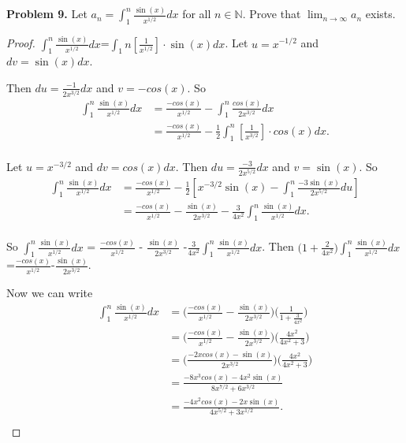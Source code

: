 \documentclass[12pt]{article}
\begin{document}
\begin{flushleft}

\textbf{Problem 9.} Let $a_{n}= \int_{1}^{n} \frac{\sin(x)}{x^{1/2}} dx$ for all $n \in \mathbb{N}$. Prove that $\lim_{n \to \infty} a_{n}$ exists. 

\vspace{.2cm}

\begin{proof}

$\int_{1}^{n} \frac{\sin(x)}{x^{1/2}} dx$=$\int_{1}{n} [\frac{1}{x^{1/2}}] \cdot \sin(x) dx$. Let $u=x^{-1/2}$ and $dv=\sin(x)dx$. 

\vspace{.1cm}

Then $du=\frac{-1}{2x^{3/2}}dx$ and $v=-cos(x)$. So 
\begin{align*}
\int_{1}^{n} \frac{\sin(x)}{x^{1/2}} dx &= \frac{-cos(x)}{x^{1/2}} - \int_{1}^{n} \frac{cos(x)}{2x^{3/2}} dx \\
							  &= \frac{-cos(x)}{x^{1/2}} - \frac{1}{2} \int_{1}^{n} [\frac{1}{x^{3/2}}] \cdot cos(x) dx. \\
\end{align*}

Let $u=x^{-3/2}$ and $dv=cos(x)dx$. Then $du=\frac{-3}{2x^{5/2}}dx$ and $v=\sin(x)$. So
\begin{align*}
\int_{1}^{n} \frac{\sin(x)}{x^{1/2}} dx &= \frac{-cos(x)}{x^{1/2}} - \frac{1}{2}[x^{-3/2}\sin(x)-\int_{1}^{n} \frac{-3\sin(x)}{2x^{5/2}} du] \\
						      &= \frac{-cos(x)}{x^{1/2}} - \frac{\sin(x)}{2x^{3/2}} -\frac{3}{4x^{2}} \int_{1}^{n} \frac{\sin(x)}{x^{1/2}} dx.\\
\end{align*}

So $\int_{1}^{n} \frac{\sin(x)}{x^{1/2}} dx$ = $\frac{-cos(x)}{x^{1/2}}$ - $\frac{\sin(x)}{2x^{3/2}}$ -$\frac{3}{4x^{2}} \int_{1}^{n} \frac{\sin(x)}{x^{1/2}} dx$. Then 
$\big(1+\frac{2}{4x^{2}}\big) \int_{1}^{n} \frac{\sin(x)}{x^{1/2}} dx$=$\frac{-cos(x)}{x^{1/2}}$-$\frac{\sin(x)}{2x^{3/2}}$.

\vspace{.1cm}

Now we can write
\begin{align*}
\int_{1}^{n} \frac{\sin(x)}{x^{1/2}}dx 
	&=\big( \frac{-cos(x)}{x^{1/2}} - \frac{\sin(x)}{2x^{3/2}}\big) \big( \frac{1}{1+\frac{3}{4x^{2}}} \big) \\
	&= \big( \frac{-cos(x)}{x^{1/2}} - \frac{\sin(x)}{2x^{3/2}} \big) \big( \frac{4x^{2}}{4x^{2}+3} \big) \\
	&= \big( \frac{-2xcos(x)-\sin(x)}{2x^{3/2}} \big) \big( \frac{4x^{2}}{4x^{2}+3} \big) \\
	&= \frac{-8x^{3}cos(x)-4x^{2}\sin(x)}{8x^{7/2}+6x^{3/2}} \\
	&= \frac{-4x^{2}cos(x) - 2x\sin(x)}{4x^{5/2}+3x^{1/2}}.\\
\end{align*}


\end{proof}
\end{flushleft}
\end{document}
